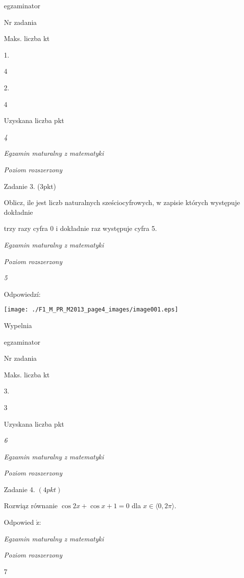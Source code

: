 \documentclass[a4paper,12pt]{article}
\begin{document}
egzaminator

Nr zadania

Maks. liczba kt

1.

4

2.

4

Uzyskana liczba pkt





{\it 4}

{\it Egzamin maturalny z matematyki}

{\it Poziom rozszerzony}

Zadanie 3. (3pkt)

Oblicz, ile jest liczb naturalnych sześciocyfrowych, w zapisie których występuje dokładnie

trzy razy cyfra 0 i dokładnie raz występuje cyfra 5.





{\it Egzamin maturalny z matematyki}

{\it Poziom rozszerzony}

{\it 5}

Odpowiedzí:
\begin{center}
\texttt{[image: ./F1\_M\_PR\_M2013\_page4\_images/image001.eps]}
\end{center}
Wypelnia

egzaminator

Nr zadania

Maks. liczba kt

3.

3

Uzyskana liczba pkt





{\it 6}

{\it Egzamin maturalny z matematyki}

{\it Poziom rozszerzony}

Zadanie 4. $(4pkt)$

Rozwiąz równanie $\cos 2x+\cos x+1=0$ dla $x\in\langle 0,2\pi\rangle.$

Odpowied $\acute{\mathrm{z}}$:





{\it Egzamin maturalny z matematyki}

{\it Poziom rozszerzony}

7
\end{document}
